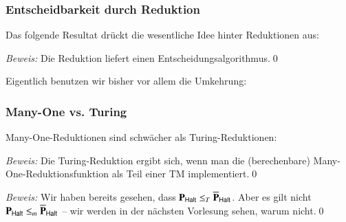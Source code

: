\documentclass[onlymath]{beamer}
\begin{document}
\begin{frame}\frametitle{Entscheidbarkeit durch Reduktion}

Das folgende Resultat drückt die wesentliche Idee hinter Reduktionen aus:\bigskip


\emph{Beweis:} Die Reduktion liefert einen Entscheidungsalgorithmus.\qed\bigskip\pause

Eigentlich benutzen wir bisher vor allem die Umkehrung:\bigskip


\end{frame}

\begin{frame}\frametitle{Many-One vs. Turing}
\pause

Many-One-Reduktionen sind schwächer als Turing-Reduktionen:\bigskip


\emph{Beweis:} Die Turing-Reduktion ergibt sich, wenn man die (berechenbare) Many-One-Reduktionsfunktion als Teil einer TM implementiert.\qed
\bigskip\pause


\emph{Beweis:} Wir haben bereits gesehen, dass $\textbf{\textcolor{black}{P}}_{\textsf{Halt}}\leq_T\overline{\textbf{\textcolor{black}{P}}}_{\textsf{Halt}}$. Aber es gilt nicht $\textbf{\textcolor{black}{P}}_{\textsf{Halt}}\leq_m\overline{\textbf{\textcolor{black}{P}}}_{\textsf{Halt}}$ -- wir werden in der nächsten Vorlesung sehen, warum nicht.\qed

\end{frame}

% 
% 
% 
% 
% 
\end{document}
